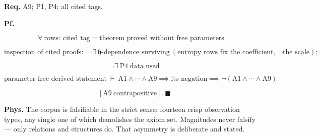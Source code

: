 \begin{theorem}
\textbf{Req.} A9; P1, P4; all cited tags.

\textbf{Pf.}

\[
\forall\ \text{rows}:\ \text{cited tag}=\text{theorem proved without free parameters}
\]

\[
\text{inspection of cited proofs}:\ \ \neg\exists\ \mathfrak h\text{-dependence surviving}\ (\text{entropy rows fix the coefficient},\ \neg\text{the scale});
\]

\[
\quad\neg\exists\ \mathrm{P4}\ \text{data used}
\]

\[
\text{parameter-free derived statement}\ \vdash\ \mathrm{A1}\wedge\cdots\wedge\mathrm{A9}\implies\text{its negation}\implies\neg(\mathrm{A1}\wedge\cdots\wedge\mathrm{A9})
\]

\[
\quad [\mathrm{A9}\ \text{contrapositive}].\ \blacksquare
\]

\textbf{Phys.} The corpus is falsifiable in the strict sense: fourteen crisp observation types, any single one of which demolishes the axiom set. Magnitudes never falsify — only relations and structures do. That asymmetry is deliberate and stated.

\end{theorem}

